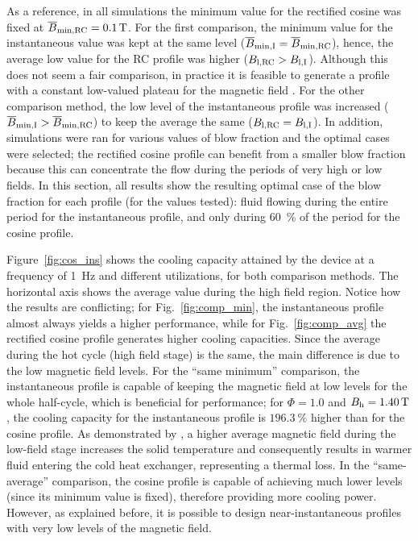 \documentclass[draft]{svjour3}
\begin{document}
As a reference, in all simulations  the minimum value for the rectified cosine was fixed at $\overline{B}_{\mathrm{min,RC}} = \SI{0.1}{\tesla}$. For the first comparison, the minimum value for the instantaneous value was kept at the same level ($\overline{B}_{\mathrm{min,I}} =  \overline{B}_{\mathrm{min,RC}}$), hence, the average low value for the RC profile was higher ($B_{\mathrm{l,RC}} > B_{\mathrm{l,I}}$). Although this does not seem a fair comparison, in practice it is feasible to generate a profile with a constant low-valued plateau for the magnetic field \cite{bib:insinga16_optim,bib:benedict16_desig}. For the other comparison method, the low level of the instantaneous profile was increased ($\overline{B}_{\mathrm{min,I}} >  \overline{B}_{\mathrm{min,RC}}$) to keep the average the same ($B_{\mathrm{l,RC}} = B_{\mathrm{l,I}}$). In addition, simulations were ran for various values of blow fraction and the optimal cases were selected; the rectified cosine profile can benefit from a smaller blow fraction because this can concentrate the flow during the periods of very high or low fields. In this section, all results show the resulting optimal case of the blow fraction for each profile (for the values tested): fluid flowing during the entire period for the instantaneous profile, and only during \SI{60}{\percent} of the period for the cosine profile.


Figure~\ref{fig:cos_ins} shows the cooling capacity attained by the device at a frequency of \SI{1}{\hertz} and different utilizations, for both comparison methods.  The horizontal axis shows the average value during the high field region. Notice how the results are conflicting; for Fig.~\ref{fig:comp_min}, the instantaneous profile almost always yields a higher performance, while for Fig.~\ref{fig:comp_avg} the rectified cosine profile generates higher cooling capacities. Since the average during the hot cycle (high field stage) is the same, the main difference is due to the low magnetic field levels. For the ``same minimum'' comparison, the instantaneous profile is capable of keeping the magnetic field at low levels for the whole half-cycle, which is beneficial for performance;  for $\Phi=1.0$ and $B_{\mathrm{h}} = \SI{1.40}{\tesla}$, the cooling capacity for the instantaneous profile is $\SI{196.3}{\percent}$ higher than for the cosine profile.  As demonstrated by \cite{bib:asme-mce}, a higher average magnetic field during the low-field stage increases the solid temperature and consequently results in  warmer fluid entering the cold heat exchanger, representing a thermal loss. In the ``same-average'' comparison, the cosine profile is capable of achieving much lower levels (since its minimum value is fixed), therefore providing more cooling power. However, as explained before, it is possible to design near-instantaneous profiles with very low levels of the magnetic field.
\end{document}
